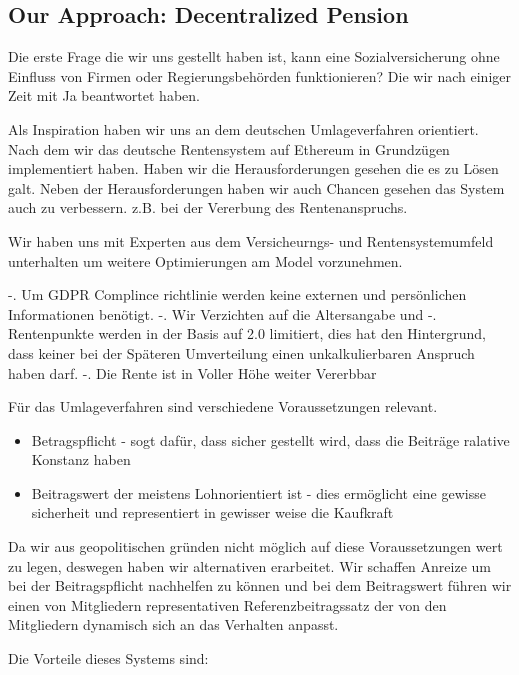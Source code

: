 \subsection{Our Approach: Decentralized Pension}

Die erste Frage die wir uns gestellt haben ist, kann eine Sozialversicherung ohne Einfluss von Firmen oder Regierungsbehörden funktionieren? Die wir nach einiger Zeit mit Ja beantwortet haben.

Als Inspiration haben wir uns an dem deutschen Umlageverfahren orientiert. Nach dem wir das deutsche Rentensystem auf Ethereum in Grundzügen implementiert haben. Haben wir die Herausforderungen gesehen die es zu Lösen galt.
Neben der Herausforderungen haben wir auch Chancen gesehen das System auch zu verbessern. z.B. bei der Vererbung des Rentenanspruchs.

Wir haben uns mit Experten aus dem Versicheurngs- und Rentensystemumfeld unterhalten um weitere Optimierungen am Model vorzunehmen.

-. Um GDPR Complince richtlinie werden keine externen und persönlichen Informationen benötigt.
-. Wir Verzichten auf die Altersangabe und
-. Rentenpunkte werden in der Basis auf 2.0 limitiert, dies hat den Hintergrund, dass keiner bei der Späteren Umverteilung einen unkalkulierbaren Anspruch haben darf.
-. Die Rente ist in Voller Höhe weiter Vererbbar


Für das Umlageverfahren sind verschiedene Voraussetzungen relevant. 

\begin{itemize}
\item Betragspflicht - sogt dafür, dass sicher gestellt wird, dass die Beiträge ralative Konstanz haben
\item Beitragswert der meistens Lohnorientiert ist - dies ermöglicht eine gewisse sicherheit und representiert in gewisser weise die Kaufkraft
\end{itemize}

Da wir aus geopolitischen gründen nicht möglich auf diese Voraussetzungen wert zu legen, deswegen haben wir alternativen erarbeitet.
Wir schaffen Anreize um bei der Beitragspflicht nachhelfen zu können und bei dem Beitragswert führen wir einen von Mitgliedern representativen Referenzbeitragssatz der von den Mitgliedern dynamisch sich an das Verhalten anpasst.

Die Vorteile dieses Systems sind:

